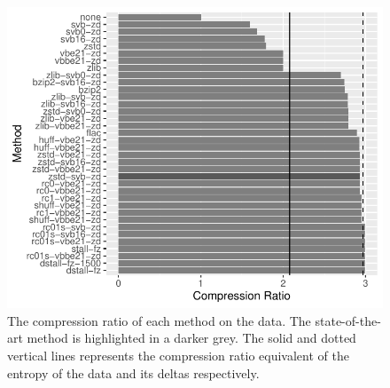 \begin{figure}
\centering
%
\includegraphics[scale=0.9]{plots/reads.blow5.test.ratio.bar.pdf}
\caption{\label{fig:results-ratio}The compression ratio of each method on the
	data. The state-of-the-art method is highlighted in a darker grey.
	The solid and dotted vertical lines represents the compression ratio
	equivalent of the entropy of the data and its deltas respectively.}
\end{figure}
